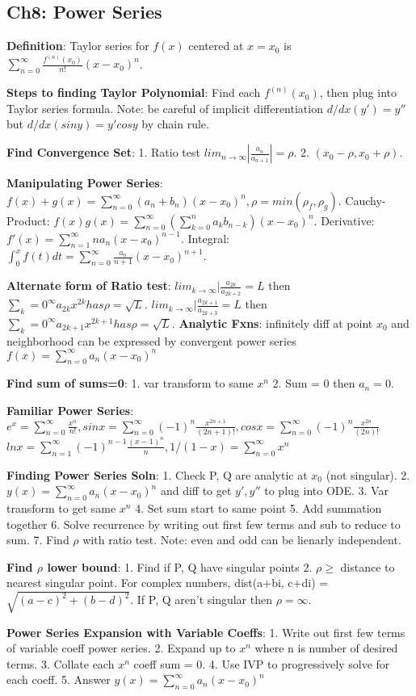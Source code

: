 \subsection*{Ch8: Power Series}

\textbf{Definition}: Taylor series for $f(x)$ centered at $x = x_0$ is $\sum_{n=0}^{\infty} \frac{f^{(n)}(x_0)}{n!}(x-x_0)^n$.

\textbf{Steps to finding Taylor Polynomial}: Find each $f^{(n)}(x_0)$, then plug into Taylor series formula. Note: be careful of implicit 
differentiation $d/dx(y') = y''$ but $d/dx(siny) = y'cosy$ by chain rule. 

\textbf{Find Convergence Set}: 1. Ratio test $lim_{n \rightarrow \infty} |\frac{a_{n}}{a_{n+1}}| = \rho$. 2. $(x_0-\rho, x_0 + \rho)$.  

\textbf{Manipulating Power Series}: $f(x) + g(x) = \sum_{n=0}^\infty (a_n + b_n)(x-x_0)^n, \rho = min(\rho_f, \rho_g)$. 
Cauchy-Product: $f(x)g(x) = \sum_{n=0}^\infty (\sum_{k=0}^n a_kb_{n-k})(x-x_0)^n$. Derivative: $f'(x) = \sum_{n=1}^\infty na_n(x-x_0)^{n-1}$. 
Integral: $\int_0^x f(t)dt = \sum_{n=0}^\infty \frac{a_n}{n+1}(x-x_0)^{n+1}$.

\textbf{Alternate form of Ratio test}: $lim_{k \rightarrow \infty} |\frac{a_{2k}}{a_{2k+2}} = L$ then $\sum_k=0^\infty a_{2k}x^{2k} has \rho = \sqrt{L}$.
$lim_{k \rightarrow \infty} |\frac{a_{2k+1}}{a_{2k+3}} = L$ then $\sum_k=0^\infty a_{2k+1}x^{2k+1} has \rho = \sqrt{L}$.
\textbf{Analytic Fxns}: infinitely diff at point $x_0$ and neighborhood can be expressed by convergent power series $f(x) = \sum_{n=0}^\infty a_n(x-x_0)^n$

\textbf{Find sum of sums=0}: 1. var transform to same $x^n$ 2. Sum = 0 then $a_n = 0$. 

\textbf{Familiar Power Series}: $e^x = \sum_{n=0}^\infty \frac{x^n}{n!}, sinx = \sum_{n=0}^\infty (-1)^n\frac{x^{2n+1}}{(2n+1)!}, cosx = \sum_{n=0}^\infty (-1)^n\frac{x^{2n}}{(2n)!}$
$lnx = \sum_{n=1}^\infty (-1)^{n-1}\frac{(x-1)^n}{n}, 1/(1-x) = \sum_{n=0}^\infty x^n$

\textbf{Finding Power Series Soln}: 1. Check P, Q are analytic at $x_0$ (not singular). 2. $y(x) = \sum_{n=0}^\infty a_n(x-x_0)^n$ and diff to get $y', y''$ to plug into ODE. 
3. Var transform to get same $x^n$ 4. Set sum start to same point 5. Add summation together 6. Solve recurrence by writing out first few terms and sub to reduce to 
sum. 7. Find $\rho$ with ratio test. Note: even and odd can be lienarly independent. 

\textbf{Find $\rho$ lower bound}: 1. Find if P, Q have singular points 2. $\rho \geq$ distance to nearest singular point. For complex numbers, 
dist(a+bi, c+di) = $\sqrt{(a-c)^2 + (b-d)^2}$. If P, Q aren't singular then $\rho = \infty$.

\textbf{Power Series Expansion with Variable Coeffs}: 
1. Write out first few terms of variable coeff power series. 2. Expand up to $x^n$ where n is number of desired terms. 3. Collate each $x^n$ coeff sum = 0. 
4. Use IVP to progressively solve for each coeff. 5. Answer $y(x) = \sum_{n=0}^\infty a_n(x-x_0)^n$